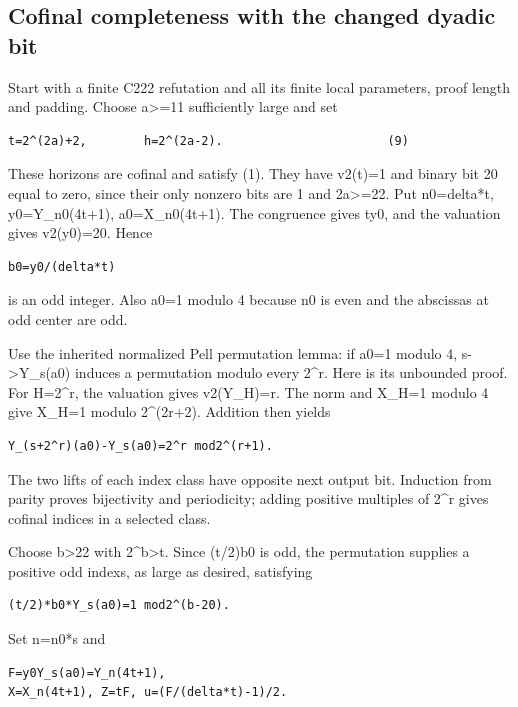 \subsection{Cofinal completeness with the changed dyadic
bit}\label{cofinal-completeness-with-the-changed-dyadic-bit}

Start with a finite C222 refutation and all its finite local parameters,
proof length and padding. Choose a\textgreater=11 sufficiently large and
set

\begin{verbatim}
t=2^(2a)+2,        h=2^(2a-2).                       (9)
\end{verbatim}

These horizons are cofinal and satisfy (1). They have v2(t)=1 and binary
bit 20 equal to zero, since their only nonzero bits are 1 and
2a\textgreater=22. Put n0=delta*t, y0=Y\_n0(4t+1), a0=X\_n0(4t+1). The
congruence gives t\textbar y0, and the valuation gives v2(y0)=20. Hence

\begin{verbatim}
b0=y0/(delta*t)
\end{verbatim}

is an odd integer. Also a0=1 modulo 4 because n0 is even and the
abscissas at odd center are odd.

Use the inherited normalized Pell permutation lemma: if a0=1 modulo 4,
s-\textgreater Y\_s(a0) induces a permutation modulo every 2\^{}r. Here
is its unbounded proof. For H=2\^{}r, the valuation gives v2(Y\_H)=r.
The norm and X\_H=1 modulo 4 give X\_H=1 modulo 2\^{}(2r+2). Addition
then yields

\begin{verbatim}
Y_(s+2^r)(a0)-Y_s(a0)=2^r mod2^(r+1).
\end{verbatim}

The two lifts of each index class have opposite next output bit.
Induction from parity proves bijectivity and periodicity; adding
positive multiples of 2\^{}r gives cofinal indices in a selected class.

Choose b\textgreater22 with 2\^{}b\textgreater t. Since (t/2)b0 is odd,
the permutation supplies a positive odd indexs, as large as desired,
satisfying

\begin{verbatim}
(t/2)*b0*Y_s(a0)=1 mod2^(b-20).
\end{verbatim}

Set n=n0*s and

\begin{verbatim}
F=y0Y_s(a0)=Y_n(4t+1),
X=X_n(4t+1), Z=tF, u=(F/(delta*t)-1)/2.
\end{verbatim}

